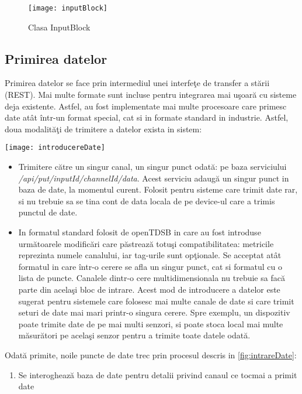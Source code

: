 \begin{figure}[h]
	\centering
	\texttt{[image: inputBlock]}
	\caption{Clasa InputBlock}
\end{figure}
\subsection{Primirea datelor}
Primirea datelor se face prin intermediul unei interfeţe de transfer a stării (REST). Mai multe formate sunt incluse pentru integrarea mai uşoară cu sisteme deja existente. Astfel, au fost implementate mai multe procesoare care primesc date atât într-un format special, cat si in formate standard in industrie.
Astfel, doua modalităţi de trimitere a datelor exista in sistem:
\begin{sidewaysfigure}
	\centering
	\texttt{[image: introducereDate]}
	\caption{Diagrama de secvente pentru intorducerea de noi date}
	\label{fig:intrareDate}
\end{sidewaysfigure}
\begin{itemize}
	\item Trimitere către un singur canal, un singur punct odată: pe baza serviciului\\ \textit{/api/put/{inputId}/{channelId}/{data}}. Acest serviciu adaugă un singur punct in baza de date, la momentul curent. Folosit pentru sisteme care trimit date rar, si nu trebuie sa se tina cont de data locala de pe device-ul care a trimis punctul de date.
	\item In formatul standard folosit de openTDSB in care au fost introduse următoarele modificări care păstrează totuşi compatibilitatea: metricile reprezinta numele canalului, iar tag-urile sunt opţionale. Se acceptat atât formatul in care într-o cerere se afla un singur punct, cat si formatul cu o lista de puncte. Canalele dintr-o cere multidimensionala nu trebuie sa facă parte din acelaşi bloc de intrare. Acest mod de introducere a datelor este sugerat pentru sistemele care folosesc mai multe canale de date si care trimit seturi de date mai mari printr-o singura cerere. Spre exemplu, un dispozitiv poate trimite date de pe mai multi senzori, si poate stoca local mai multe măsurători pe acelaşi senzor pentru a trimite toate datele odată.
\end{itemize}
Odată primite, noile puncte de date trec prin procesul descris in \cref{fig:intrareDate}:
\begin{enumerate}
	\item Se interoghează baza de date pentru detalii privind canaul ce tocmai a primit date
\end{enumerate}



